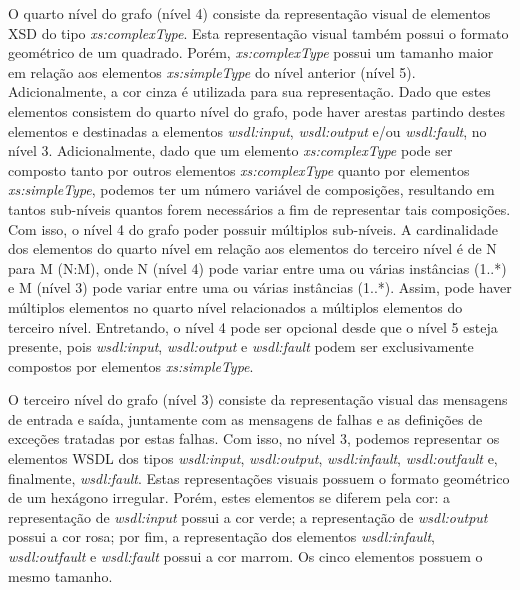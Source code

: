 O quarto nível do grafo (nível 4) consiste da representação visual de elementos XSD do tipo \textit{xs:complexType}. Esta representação visual também possui o formato geométrico de um quadrado. Porém, \textit{xs:complexType} possui um tamanho maior em relação aos elementos \textit{xs:simpleType} do nível anterior (nível 5). Adicionalmente, a cor cinza é utilizada para sua representação. Dado que estes elementos consistem do quarto nível do grafo, pode haver arestas partindo destes elementos e destinadas a elementos \textit{wsdl:input}, \textit{wsdl:output} e/ou \textit{wsdl:fault}, no nível 3. Adicionalmente, dado que um elemento \textit{xs:complexType} pode ser composto tanto por outros elementos \textit{xs:complexType} quanto por elementos \textit{xs:simpleType}, podemos ter um número variável de composições, resultando em tantos sub-níveis quantos forem necessários a fim de representar tais composições. Com isso, o nível 4 do grafo poder possuir múltiplos sub-níveis. A cardinalidade dos elementos do quarto nível em relação aos elementos do terceiro nível é de N para M (N:M), onde N (nível 4) pode variar entre uma ou várias instâncias (1..*) e M (nível 3) pode variar entre uma ou várias instâncias (1..*). Assim, pode haver múltiplos elementos no quarto nível relacionados a múltiplos elementos do terceiro nível. Entretando, o nível 4 pode ser opcional desde que o nível 5 esteja presente, pois \textit{wsdl:input}, \textit{wsdl:output} e \textit{wsdl:fault} podem ser exclusivamente compostos por elementos \textit{xs:simpleType}.

O terceiro nível do grafo (nível 3) consiste da representação visual das mensagens de entrada e saída, juntamente com as mensagens de falhas e as definições de exceções tratadas por estas falhas. Com isso, no nível 3, podemos representar os elementos WSDL dos tipos \textit{wsdl:input}, \textit{wsdl:output}, \textit{wsdl:infault}, \textit{wsdl:outfault} e, finalmente, \textit{wsdl:fault}. Estas representações visuais possuem o formato geométrico de um hexágono irregular. Porém, estes elementos se diferem pela cor: a representação de \textit{wsdl:input} possui a cor verde; a representação de \textit{wsdl:output} possui a cor rosa; por fim, a representação dos elementos \textit{wsdl:infault}, \textit{wsdl:outfault} e \textit{wsdl:fault} possui a cor marrom. Os cinco elementos possuem o mesmo tamanho.

